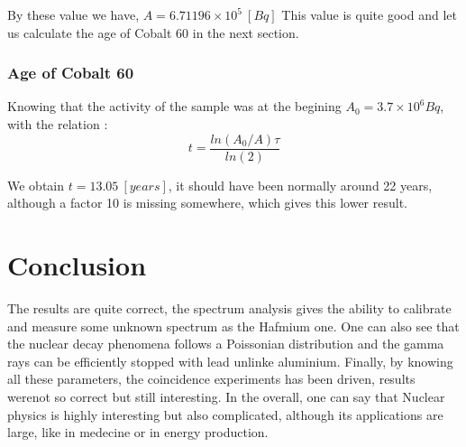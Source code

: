 \documentclass[a4paper,12pt,oneside]{article}
\def \be {\begin{equation}}
\def \ee {\end{equation}}
\begin{document}
	By these value we have, $A = 6.71196\times 10^5\ [Bq]$
	This value is quite good and let us calculate the age of Cobalt 60 in the next section.



	


\subsubsection{Age of Cobalt 60}

	Knowing that the activity of the sample was at the begining $A_0 = 3.7\times10^6 Bq$, with the relation :
	\be
		t=\frac	{ln(A_0/A)\tau}{ln(2)}
	\ee
	
	We obtain $t=13.05\ [years]$, it should have been normally around 22 years, although a factor 10 is missing somewhere, which gives this lower result.








\newpage
\section{Conclusion}
The results are quite correct, the spectrum analysis gives the ability to calibrate and measure some unknown spectrum as the Hafmium one. One can also see that the nuclear decay phenomena follows a Poissonian distribution and the gamma rays can be efficiently stopped with lead unlinke aluminium. Finally, by knowing all these parameters, the coincidence experiments has been driven, results werenot so correct but still interesting. In the overall, one can say that Nuclear physics is highly interesting but also complicated, although its applications are large, like in medecine or in energy production.




\end{document}
